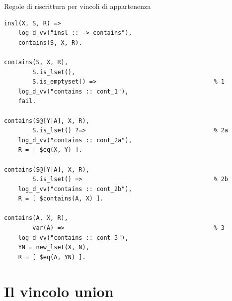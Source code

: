 \documentclass[12pt,a4paper,openright]{book} %
\begin{document}
\begin{algorithm}[H]
	\caption{Regole di riscrittura per vincoli di appartenenza}
	\label{alg:in_constraints}
\end{algorithm}
\begin{verbatim}
insl(X, S, R) =>
    log_d_vv("insl :: -> contains"),
    contains(S, X, R).

contains(S, X, R),
        S.is_lset(),
        S.is_emptyset() =>                                 % 1
    log_d_vv("contains :: cont_1"),
    fail.

contains(S@[Y|A], X, R),
        S.is_lset() ?=>                                    % 2a
    log_d_vv("contains :: cont_2a"),
    R = [ $eq(X, Y) ].

contains(S@[Y|A], X, R),
        S.is_lset() =>                                     % 2b
    log_d_vv("contains :: cont_2b"),
    R = [ $contains(A, X) ].

contains(A, X, R),
        var(A) =>                                          % 3
    log_d_vv("contains :: cont_3"),
    YN = new_lset(X, N),
    R = [ $eq(A, YN) ].
\end{verbatim}

\section{Il vincolo union}
\end{document}
